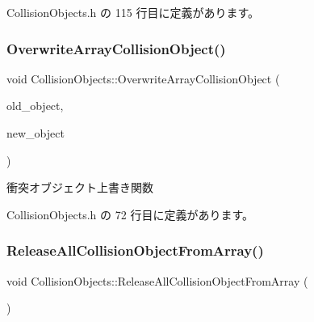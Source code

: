  Collision\+Objects.\+h の 115 行目に定義があります。

\mbox{\label{class_collision_objects_aed8d6903485ae775d8bbff511796a653}} 
\subsubsection{\texorpdfstring{Overwrite\+Array\+Collision\+Object()}{OverwriteArrayCollisionObject()}}
{\footnotesize\ttfamily void Collision\+Objects\+::\+Overwrite\+Array\+Collision\+Object (\begin{DoxyParamCaption}\item[{\mbox{\hyperlink{class_collision_object}{Collision\+Object}} $\ast$}]{old\+\_\+object,  }\item[{\mbox{\hyperlink{class_collision_object}{Collision\+Object}} $\ast$}]{new\+\_\+object }\end{DoxyParamCaption})\hspace{0.3cm}{\ttfamily [inline]}}



衝突オブジェクト上書き関数 



 Collision\+Objects.\+h の 72 行目に定義があります。

\mbox{\label{class_collision_objects_a2efe32f283fe9b2a30ff8d1e370f152d}} 
\subsubsection{\texorpdfstring{Release\+All\+Collision\+Object\+From\+Array()}{ReleaseAllCollisionObjectFromArray()}}
{\footnotesize\ttfamily void Collision\+Objects\+::\+Release\+All\+Collision\+Object\+From\+Array (\begin{DoxyParamCaption}{ }\end{DoxyParamCaption})\hspace{0.3cm}{\ttfamily [inline]}}



